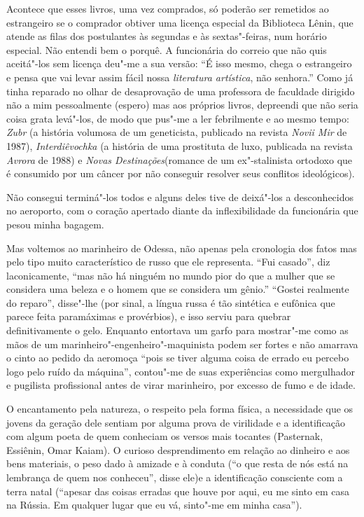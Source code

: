 Acontece que esses livros, uma vez comprados, só poderão ser remetidos
ao estrangeiro se o comprador obtiver uma licença especial da Biblioteca
Lênin, que atende as filas dos postulantes às segundas e às
sextas"-feiras, num horário especial. Não entendi bem o porquê. A
funcionária do correio que não quis aceitá"-los sem licença deu"-me a sua
versão: ``É isso mesmo, chega o estrangeiro e pensa que vai levar assim
fácil nossa \emph{literatura artística}, não senhora.'' Como já tinha
reparado no olhar de desaprovação de uma professora de faculdade
dirigido não a mim pessoalmente (espero) mas aos próprios livros,
depreendi que não seria coisa grata levá"-los, de modo que pus"-me a ler
febrilmente e ao mesmo tempo: \emph{Zubr} (a história volumosa de um
geneticista, publicado na revista \emph{Novii Mir} de 1987),
\emph{Interdiêvochka} (a história de uma prostituta de luxo, publicada
na revista \emph{Avrora} de 1988) e \emph{Novas Destinações}(romance de
um ex"-stalinista ortodoxo que é consumido por um câncer por não
conseguir resolver seus conflitos ideológicos).

Não consegui terminá"-los todos e alguns deles tive de deixá"-los a
desconhecidos no aeroporto, com o coração apertado diante da
inflexibilidade da funcionária que pesou minha bagagem.

Mas voltemos ao marinheiro de Odessa, não apenas pela cronologia dos
fatos mas pelo tipo muito característico de russo que ele representa.
``Fui casado'', diz laconicamente, ``mas não há ninguém no mundo pior do
que a mulher que se considera uma beleza e o homem que se considera um
gênio.'' ``Gostei realmente do reparo'', disse"-lhe (por sinal, a língua
russa é tão sintética e eufônica que parece feita paramáximas e
provérbios), e isso serviu para quebrar definitivamente o gelo. Enquanto
entortava um garfo para mostrar"-me como as mãos de um
marinheiro"-engenheiro"-maquinista podem ser fortes e não amarrava o cinto
ao pedido da aeromoça ``pois se tiver alguma coisa de errado eu percebo
logo pelo ruído da máquina'', contou"-me de suas experiências como
mergulhador e pugilista profissional antes de virar marinheiro, por
excesso de fumo e de idade.

O encantamento pela natureza, o respeito pela forma física, a
necessidade que os jovens da geração dele sentiam por alguma prova de
virilidade e a identificação com algum poeta de quem conheciam os versos
mais tocantes (Pasternak, Essiênin, Omar Kaiam). O curioso
desprendimento em relação ao dinheiro e aos bens materiais, o peso dado
à amizade e à conduta (``o que resta de nós está na lembrança de quem
nos conheceu'', disse ele)e a identificação consciente com a terra natal
(``apesar das coisas erradas que houve por aqui, eu me sinto em casa na
Rússia. Em qualquer lugar que eu vá, sinto"-me em minha casa'').

